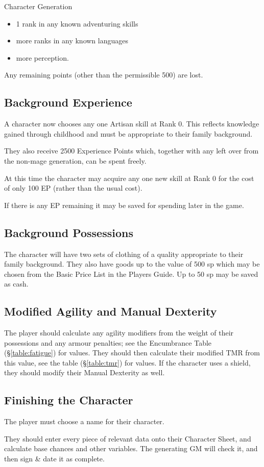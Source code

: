 \begin{Chapter}{Character Generation}
\begin{enumerate}
  \begin{itemize}
    \item 1 rank in any known adventuring skills  
    \item more ranks in any known languages
    \item more perception. 
  \end{itemize}

\end{enumerate}

Any remaining points (other than the permissible 500) are lost.

\subsection{Background Experience}

A character now chooses any one Artisan skill at Rank 0.  This
reflects knowledge gained through childhood and must be appropriate to
their family background.

They also receive 2500 Experience Points which, together with any left
over from the non-mage generation, can be spent freely.

At this time the character may acquire any one new skill at Rank 0 for
the cost of only 100 EP (rather than the usual cost).

If there is any EP remaining it may be saved for spending later in the
game.

\subsection{Background Possessions}

The character will have two sets of clothing of a quality appropriate
to their family background.  They also have goods up to the value of
500 sp which may be chosen from the Basic Price List in the Players
Guide.  Up to 50 sp may be saved as cash.

\subsection{Modified Agility and Manual Dexterity}

The player should calculate any agility modifiers from the weight of
their possessions and any armour penalties; see the Encumbrance Table
(\S\ref{table:fatigue}) for values.  They should then calculate their
modified TMR from this value, see the table (\S\ref{table:tmr}) for
values.  If the character uses a shield, they should modify their
Manual Dexterity as well.

\subsection{Finishing the Character}

The player must choose a name for their character. 

They should enter every piece of relevant data onto their Character
Sheet, and calculate base chances and other variables. The generating
GM will check it, and then sign \& date it as complete.

\end{Chapter}
